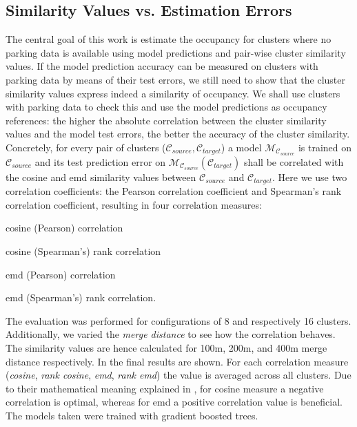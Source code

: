 \subsection{Similarity Values vs. Estimation Errors}
\label{evaluation:similarity_vs_estimation_sec}
The central goal of this work is estimate the occupancy for clusters where no parking data is available using model predictions and pair-wise cluster similarity values. If the model prediction accuracy can be measured on clusters with parking data by means of their test errors, we still need to show that the cluster similarity values express indeed a similarity of occupancy. We shall use clusters with parking data to check this and use the model predictions as occupancy references: the higher the absolute correlation between the cluster similarity values and the model test errors, the better the accuracy of the cluster similarity. Concretely, for every pair of clusters ($\mathcal{C}_{source}, \mathcal{C}_{target}$) a model $\mathcal{M}_{\mathcal{C}_{source}}$ is trained on $\mathcal{C}_{source}$ and its test prediction error on $\mathcal{M}_{\mathcal{C}_{source}}(\mathcal{C}_{target})$ shall be correlated with the cosine and emd similarity values between $\mathcal{C}_{source}$ and $\mathcal{C}_{target}$. Here we use two correlation coefficients: the Pearson correlation coefficient and Spearman's rank correlation coefficient, resulting in four correlation measures: 
\begin{romanlist}
	\item	cosine (Pearson) correlation
	\item 	cosine (Spearman's) rank correlation
	\item 	emd (Pearson) correlation
	\item 	emd (Spearman's) rank correlation. 
\end{romanlist}
The evaluation was performed for configurations of 8 and respectively 16 clusters. Additionally, we varied the \textit{merge distance} to see how the correlation behaves. The similarity values are hence calculated for 100m, 200m, and 400m merge distance respectively. In  the final results are shown. For each correlation measure (\textit{cosine}, \textit{rank cosine}, \textit{emd}, \textit{rank emd}) the value is averaged across all clusters. Due to their mathematical meaning explained in , for cosine measure a negative correlation is optimal, whereas for emd a positive correlation value is beneficial. The models taken were trained with gradient boosted trees. 
	
